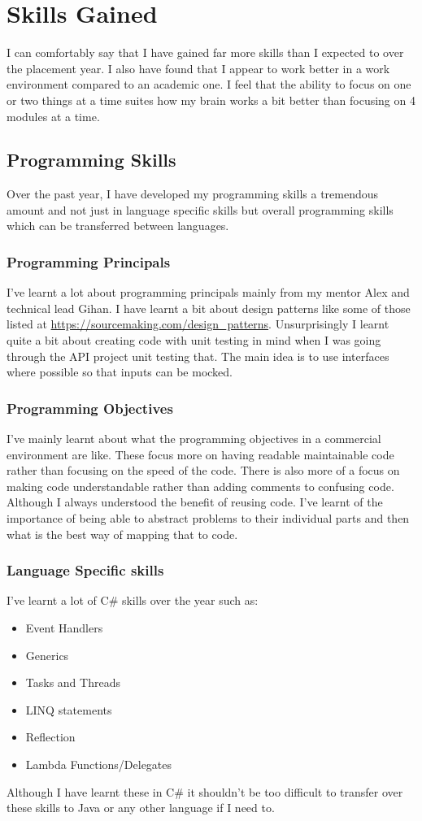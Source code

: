 \section{Skills Gained}{
	I can comfortably say that I have gained far more skills than I expected to over the placement year. I also have found that I appear to work better in a work environment compared to an academic one. I feel that the ability to focus on one or two things at a time suites how my brain works a bit better than focusing on 4 modules at a time.
	\subsection{Programming Skills}{
		Over the past year, I have developed my programming skills a tremendous amount and not just in language specific skills but overall programming skills which can be transferred between languages.
		\subsubsection*{Programming Principals}{
			I've learnt a lot about programming principals mainly from my mentor Alex and technical lead Gihan. I have learnt a bit about design patterns like some of those listed at \url{https://sourcemaking.com/design_patterns}\cite{DesignPatterns2007}. Unsurprisingly I learnt quite a bit about creating code with unit testing in mind when I was going through the API project unit testing that. The main idea is to use interfaces where possible so that inputs can be mocked.}
		\subsubsection*{Programming Objectives}{I've mainly learnt about what the programming objectives in a commercial environment are like. These focus more on having readable maintainable code rather than focusing on the speed of the code. There is also more of a focus on making code understandable rather than adding comments to confusing code. Although I always understood the benefit of reusing code. I've learnt of the importance of being able to abstract problems to their individual parts and then what is the best way of mapping that to code.}
		\subsubsection*{Language Specific skills}{
			I've learnt a lot of C\# skills over the year such as:
			\begin{itemize}
				\item{Event Handlers}
				\item{Generics}
				\item{Tasks and Threads}
				\item{LINQ statements}
				\item{Reflection}
				\item{Lambda Functions/Delegates}
			\end{itemize}
			Although I have learnt these in C\# it shouldn't be too difficult to transfer over these skills to Java or any other language if I need to.
	}
}
}
